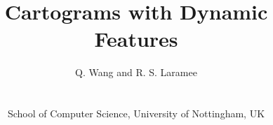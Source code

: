 \documentclass{egpubl}
\author[Q. Wang \& R. S. Laramee]
{\parbox{\textwidth}{\centering Q. Wang
  and R. S. Laramee
    }
    \\
\parbox{\textwidth}{\centering School of Computer Science, University of Nottingham, UK}
}
\title{Cartograms with Dynamic Features}
\begin{document}
\pagestyle{plain}

\let\origsection=\section
\renewcommand\section[1]{\origsection{#1}\label{sec:{#1}}}

\let\origsubsection=\subsection
\renewcommand\subsection[1]{\origsubsection{#1}\label{subsec:{#1}}}

\let\origsubsubsection=\subsubsection
\renewcommand\subsubsection[1]{\origsubsubsection{#1}\label{subsubsec:{#1}}}

\newcommand{\secref}[1]{Section~\ref{#1}}
\newcommand{\figref}[1]{Figure~\ref{#1}}
\newcommand{\tableref}[1]{Table~\ref{#1}}
\newcommand{\algoref}[1]{Algorithm~\ref{#1}}
\newcommand{\phantomref}[1]{$\hyperref[#1]{\ref{#1}}$}

\newcommand{\software}{GHRVis}

\newcommand{\bobgraph}[1]{ \noindent\textbf{#1} \phantomsection \label{bobgraph:{#1}}}

\newcommand{\mycolorbox}[2]{\begingroup\setlength{\fboxsep}{2pt}\colorbox{#1}{#2}\endgroup}

\newcommand{\citea}[1]{\citeauthor{#1}~\cite{#1}}

\newcommand{\theaderR}[1]{\multicolumn{1}{c|}{\cellcolor{Mycolor3} \textbf{\rotatebox{90}{#1 \phantom{-} }}}}
\newcommand{\theaderP}[1]{\cellcolor{Mycolor3} \textbf{#1}}
\end{document}
